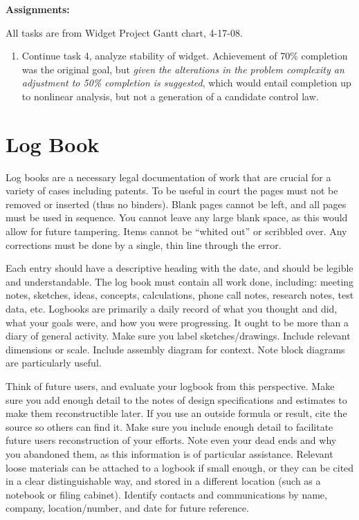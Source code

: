 \begin{figure*}[p]
\begin{center}
\begin{minipage}{4in}
\textbf{Assignments:}

All tasks are from Widget Project Gantt chart, 4-17-08.
\begin{enumerate}
\item Continue task 4, analyze stability of widget.  Achievement of 70\% completion was the original goal, but \emph{given the alterations in the problem complexity an adjustment to 50\% completion is suggested}, which would entail completion up to nonlinear analysis, but not a generation of a candidate control law.
\end{enumerate}

\end{minipage}
\end{center}
\end{figure*}

\section{Log Book}
Log books are a necessary legal documentation of work that are crucial for a variety of cases including patents.  To be useful in court the pages must not be removed or inserted (thus no binders).  Blank pages cannot be left, and all pages must be used in sequence.  You cannot leave any large blank space, as this would allow for future tampering.  Items cannot be ``whited out'' or scribbled over.  Any corrections must be done by a single, thin line through the error.

Each entry should have a descriptive heading with the date, and should be legible and understandable.  The log book must contain all work done, including: meeting notes, sketches, ideas, concepts, calculations, phone call notes, research notes, test data, etc.  Logbooks are primarily a daily record of what you thought and did, what your goals were, and how you were progressing.  It ought to be more than a diary of general activity.  Make sure you label sketches/drawings.  Include relevant dimensions or scale. Include assembly diagram for context.  Note block diagrams are particularly useful.

Think of future users, and evaluate your logbook from this perspective.  Make sure you add enough detail to the notes of design specifications and estimates to make them reconstructible later.  If you use an outside formula or result, cite the source so others can find it.  Make sure you include enough detail to facilitate future users reconstruction of your efforts.  Note even your dead ends and why you abandoned them, as this information is of particular assistance.  Relevant loose materials can be attached to a logbook if small enough, or they can be cited in a clear distinguishable way, and stored in a different location (such as a notebook or filing cabinet).  Identify contacts and communications by name, company, location/number, and date for future reference.

